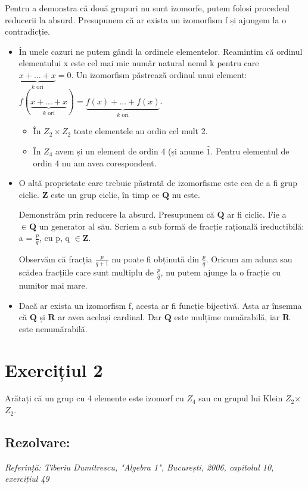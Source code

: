 \documentclass{article}
\begin{document}
Pentru a demonstra că două grupuri nu sunt izomorfe, putem folosi procedeul reducerii la absurd. Presupunem că ar exista un izomorfism f și ajungem la o contradicție.
\begin{itemize}
    \item În unele cazuri ne putem gândi la ordinele elementelor. Reamintim că ordinul elementului x este cel mai mic număr natural nenul k pentru care \(\underbrace{x + \dots + x}_{k \text{ ori}} = 0\). Un izomorfism păstrează ordinul unui element: \(f(\underbrace{x + \dots + x}_{k \text{ ori}}) = \underbrace{f(x) + \dots + f(x)}_{k \text{ ori}}\).
        \begin{itemize}
            \item În $Z_{2} \times Z_{2}$ toate elementele au ordin cel mult 2.
            \item În $Z_4$ avem și un element de ordin 4 (și anume $\hat{1}$. Pentru elementul de ordin 4 nu am avea corespondent.
        \end{itemize}

    \item O altă proprietate care trebuie păstrată de izomorfisme este cea de a fi grup ciclic. $\mathbf{Z}$ este un grup ciclic, în timp ce $\mathbf{Q}$ nu este.
    
    Demonstrăm prin reducere la absurd. Presupunem că $\mathbf{Q}$ ar fi ciclic. Fie a $\in \mathbf{Q}$ un generator al său. Scriem a sub formă de fracție rațională ireductibilă: a = $\frac{p}{q}$, cu p, q $\in \mathbf{Z}$.

    Observăm că fracția $\frac{p}{q + 1}$ nu poate fi obținută din $\frac{p}{q}$. Oricum am aduna sau scădea fracțiile care sunt multiplu de $\frac{p}{q}$, nu putem ajunge la o fracție cu numitor mai mare.

    \item Dacă ar exista un izomorfism f, acesta ar fi funcție bijectivă. Asta ar însemna că $\mathbf{Q}$ și $\mathbf{R}$ ar avea același cardinal. Dar $\mathbf{Q}$ este mulțime numărabilă, iar $\mathbf{R}$ este nenumărabilă.
\end{itemize}

\section{Exercițiul 2}
Arătați că un grup cu 4 elemente este izomorf cu $Z_4$ sau cu grupul lui Klein $Z_2$×$Z_2$.

\subsection{Rezolvare:}
\begin {small}
\emph{Referință: Tiberiu Dumitrescu, "Algebra 1", București, 2006, capitolul 10, exercițiul 49}
\end {small}
\end{document}
